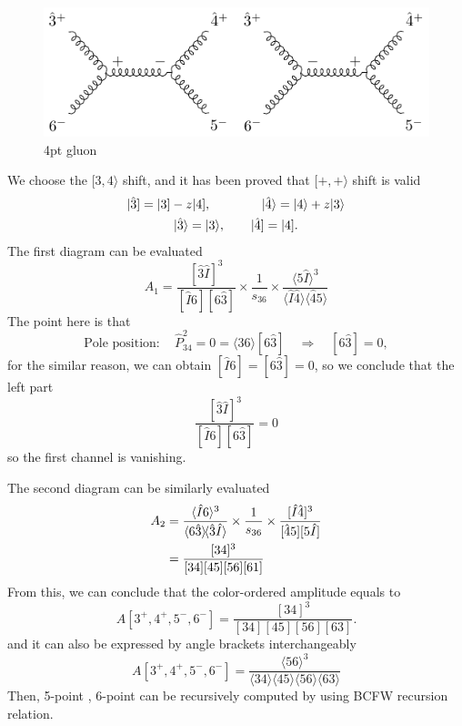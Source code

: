 \documentclass[12pt]{article}
\numberwithin{equation}{section}
\newcommand{\mdavg}[2]{\langle #1 \rangle\!\langle #2 \rangle}
\newcommand{\avg}[1]{\langle #1 \rangle}
\newcommand{\aket}[1]{|#1\rangle}
\newcommand{\sket}[1]{|#1]}
\begin{document}
\begin{figure}[H]
    \centering
    \includegraphics{4ptg.pdf}
    \caption{4pt gluon}
\end{figure}
We choose the $[3,4\rangle$ shift, and it has been proved that $[+,+\rangle$ shift is valid
\begin{gather}
    \sket{\hat{3}}=\sket{3}-z\sket{4},\qquad \qquad \aket{\hat{4}}=\aket{4}+z\aket{3} \notag\\
    \aket{\hat{3}}=\aket{3}, \qquad \sket{\hat{4}}=\sket{4}.
\end{gather}
The first diagram can be evaluated 
\begin{equation}
    A_1=\frac{[\hat{3}\hat{I}]^3}{[\hat{I}6][6\hat{3}]}\times\frac{1}{s_{36}}\times\frac{\avg{5\hat{I}}^3}{\mdavg{\hat{I}\hat{4}}{\hat{4}5}}
\end{equation}
The point here is that 
\begin{equation}
    \text{Pole position}:\quad \hat{P}_{34}^2=0=\avg{36}[6\hat{3}]\quad \Rightarrow  \quad [6\hat{3}]=0,
\end{equation}
for the similar reason, we can obtain $[\hat{I}6]=[6\hat{3}]=0$, so we conclude that the left part
\begin{equation}
    \frac{[\hat{3}\hat{I}]^3}{[\hat{I}6][6\hat{3}]}=0
\end{equation}
so the first channel is vanishing.

The second diagram can be similarly evaluated
\begin{align}
    A_2&=\frac{\avg{\hat{I}6}^3}{\mdavg{6\hat{3}}{\hat{3}\hat{I}}}\times\frac{1}{s_{36}}\times\frac{[\hat{I}\hat{4}]^3}{[\hat{4}5][5\hat{I}]}\notag \\
       &=\frac{[34]^3}{[34][45][56][61]}
\end{align}
From this, we can conclude that the color-ordered amplitude equals to
\begin{equation}
    A[3^+,4^+,5^-,6^-]=\frac{[34]^3}{[34][45][56][63]}.
\end{equation}
and it can also be expressed by angle brackets interchangeably
\begin{equation}
    A[3^+,4^+,5^-,6^-]=\frac{\avg{56}^3}{\mdavg{34}{45}\!\mdavg{56}{63}}
\end{equation}
Then, 5-point , 6-point can be recursively computed by using BCFW recursion relation. 
\end{document}
